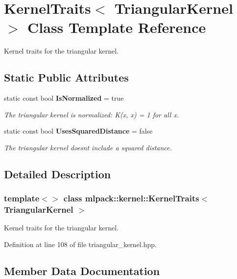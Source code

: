 \section{Kernel\+Traits$<$ Triangular\+Kernel $>$ Class Template Reference}
\label{classmlpack_1_1kernel_1_1KernelTraits_3_01TriangularKernel_01_4}


Kernel traits for the triangular kernel.  


\subsection*{Static Public Attributes}
\begin{DoxyCompactItemize}
\item 
static const bool \textbf{ Is\+Normalized} = true
\begin{DoxyCompactList}\small\item\em The triangular kernel is normalized\+: K(x, x) = 1 for all x. \end{DoxyCompactList}\item 
static const bool \textbf{ Uses\+Squared\+Distance} = false
\begin{DoxyCompactList}\small\item\em The triangular kernel doesn\textquotesingle{}t include a squared distance. \end{DoxyCompactList}\end{DoxyCompactItemize}


\subsection{Detailed Description}
\subsubsection*{template$<$$>$\newline
class mlpack\+::kernel\+::\+Kernel\+Traits$<$ Triangular\+Kernel $>$}

Kernel traits for the triangular kernel. 

Definition at line 108 of file triangular\+\_\+kernel.\+hpp.



\subsection{Member Data Documentation}
\mbox{\label{classmlpack_1_1kernel_1_1KernelTraits_3_01TriangularKernel_01_4_a213c74e1e7c01890b64c8b9e88f8c0dc}} 
